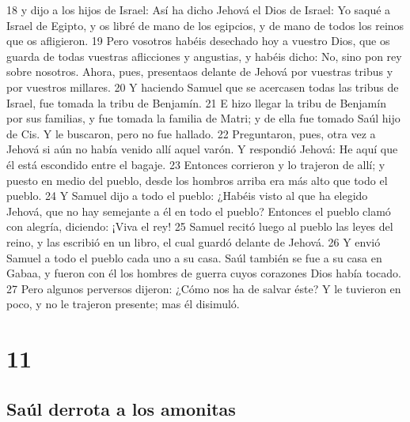 18 y dijo a los hijos de Israel: Así ha dicho Jehová el Dios de Israel: Yo saqué a Israel de Egipto, y os libré de mano de los egipcios, y de mano de todos los reinos que os afligieron.
19 Pero vosotros habéis desechado hoy a vuestro Dios, que os guarda de todas vuestras aflicciones y angustias, y habéis dicho: No, sino pon rey sobre nosotros. Ahora, pues, presentaos delante de Jehová por vuestras tribus y por vuestros millares.
20 Y haciendo Samuel que se acercasen todas las tribus de Israel, fue tomada la tribu de Benjamín.
21 E hizo llegar la tribu de Benjamín por sus familias, y fue tomada la familia de Matri; y de ella fue tomado Saúl hijo de Cis. Y le buscaron, pero no fue hallado.
22 Preguntaron, pues, otra vez a Jehová si aún no había venido allí aquel varón. Y respondió Jehová: He aquí que él está escondido entre el bagaje.
23 Entonces corrieron y lo trajeron de allí; y puesto en medio del pueblo, desde los hombros arriba era más alto que todo el pueblo.
24 Y Samuel dijo a todo el pueblo: ¿Habéis visto al que ha elegido Jehová, que no hay semejante a él en todo el pueblo? Entonces el pueblo clamó con alegría, diciendo: ¡Viva el rey!
25 Samuel recitó luego al pueblo las leyes del reino, y las escribió en un libro, el cual guardó delante de Jehová.
26 Y envió Samuel a todo el pueblo cada uno a su casa. Saúl también se fue a su casa en Gabaa, y fueron con él los hombres de guerra cuyos corazones Dios había tocado.
27 Pero algunos perversos dijeron: ¿Cómo nos ha de salvar éste? Y le tuvieron en poco, y no le trajeron presente; mas él disimuló.

\chapter{11}

\section*{Saúl derrota a los amonitas}

